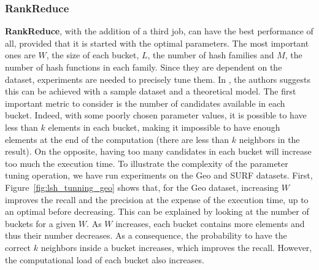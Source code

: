 \documentclass[10pt,journal,compsoc]{IEEEtran}
\newcommand{\LSH}{{\bf RankReduce}}
\begin{document}
\subsubsection{RankReduce}\label{rankreduceanalysis}
\LSH, with the addition of a third job, can have the best performance of all, provided that it is started with the 
optimal parameters.
The most important ones are $W$, the size of each bucket, $L$, the number of hash families and $M$, the number 
of hash functions in each family. Since they are dependent on the dataset, experiments are 
needed to precisely tune them. In \cite{Dong:2008:MLP:1458082.1458172_full}, the authors suggests this can be achieved 
with a sample dataset and a theoretical model. 
The first important metric to consider is the number of candidates available in each bucket. Indeed, with some 
poorly chosen parameter values, it is possible to have less than $k$ elements in each bucket, making it impossible to 
have enough elements at the end of the computation (there are less than $k$ neighbors in the result). On the opposite, 
having too many candidates in each bucket will increase too much the execution time. 
To illustrate the complexity of the parameter tuning operation, we have run experiments on the Geo and SURF datasets. 
First, Figure~\ref{fig:lsh_tunning_geo} shows that, for the Geo dataset, increasing $W$ improves the recall and the 
precision at the expense of the execution time, up to an optimal before decreasing. This can be explained by looking
at the number of buckets for a given $W$. As $W$ increases, each bucket contains more elements and thus their number 
decreases. As a consequence, the probability to have the correct $k$ neighbors inside a bucket increases, which 
improves the recall. However, the computational load of each bucket also increases.
\end{document}
